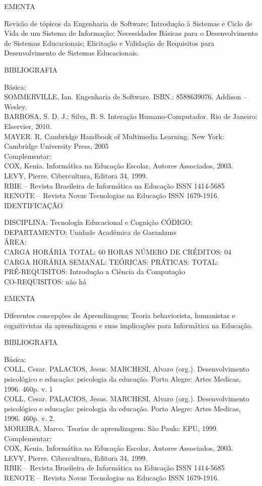 \documentclass[
	12pt,				%
	openright,			%
  oneside,     %
	a4paper,			%
	english,			%
	french,				%
	spanish,			%
	brazil				%
	]{abntex2}
\begin{document}
\begin{apendicesenv}
EMENTA 

Revisão de tópicos da Engenharia de Software; Introdução à
Sistemas e Ciclo de Vida de um Sistema de Informação;  
Necessidades Básicas para o Desenvolvimento de Sistemas Educacionais; Elicitação e Validação de Requisitos para Desenvolvimento de
Sistemas Educacionais.

BIBLIOGRAFIA 

Básica:\\
SOMMERVILLE, Ian. Engenharia de Software. ISBN.: 8588639076. Addison --
Wesley.\\
BARBOSA, S. D. J.; Silva, B. S. Interação Humano-Computador. Rio de
Janeiro: Elservier, 2010.\\
MAYER. R, Cambridge Handbook of Multimedia Learning. New York: Cambridge
University Press, 2005\\
Complementar:\\
COX, Kenia. Informática na Educação Escolar, Autores Associados, 2003.\\
LEVY, Pierre. Cibercultura, Editora 34, 1999.\\
RBIE -- Revista Brasileira de Informática na Educação ISSN 1414-5685\\
RENOTE -- Revista Novas Tecnologias na Educação ISSN 1679-1916.\\

\newpage IDENTIFICAÇÃO

DISCIPLINA: Tecnologia Educacional e Cognição CÓDIGO:\\ 
DEPARTAMENTO: Unidade Acadêmica de Garanhuns\\
ÁREA: \\
CARGA HORÁRIA TOTAL: 60 HORAS NÚMERO DE CRÉDITOS: 04\\
CARGA HORÁRIA SEMANAL: TEÓRICAS: PRÁTICAS: TOTAL: \\
PRÉ-REQUISITOS: Introdução a Ciência da Computação\\
CO-REQUISITOS: não há

EMENTA 

Diferentes concepções de Aprendizagem; Teoria behaviorista, humanistas e
cognitivistas da aprendizagem e suas implicações para Informática na
Educação.

BIBLIOGRAFIA 

Básica:\\
COLL, Cesar. PALACIOS, Jesus. MARCHESI, Alvaro (org.). Desenvolvimento
psicológico e educação: psicologia da educação. Porto Alegre: Artes
Medicas, 1996. 460p. v. 1\\
COLL, Cesar. PALACIOS, Jesus. MARCHESI, Alvaro (org.). Desenvolvimento
psicológico e educação: psicologia da educação. Porto Alegre: Artes
Medicas, 1996. 460p. v. 2.\\
MOREIRA, Marco. Teorias de aprendizagem. São Paulo: EPU, 1999.\\
Complementar:\\
COX, Kenia. Informática na Educação Escolar, Autores Associados, 2003.\\
LEVY, Pierre. Cibercultura, Editora 34, 1999.\\
RBIE -- Revista Brasileira de Informática na Educação ISSN 1414-5685\\
RENOTE -- Revista Novas Tecnologias na Educação ISSN 1679-1916.


\end{apendicesenv}
\end{document}
